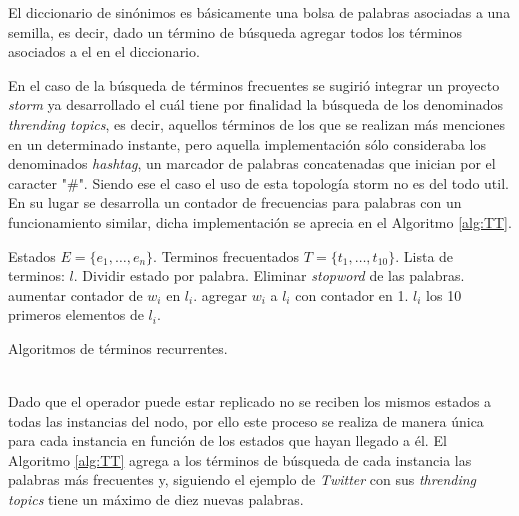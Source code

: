 El diccionario de sinónimos es básicamente una bolsa de palabras asociadas a una semilla, es decir, dado un término de búsqueda agregar todos los términos asociados a el en el diccionario.

En el caso de la búsqueda de términos frecuentes se sugirió integrar un proyecto \textit{storm} ya desarrollado el cuál tiene por finalidad la búsqueda de los denominados \textit{thrending topics}, es decir, aquellos términos de los que se realizan más menciones en un determinado instante, pero aquella implementación sólo consideraba los denominados \textit{hashtag}, un marcador de palabras concatenadas que inician por el caracter "\#". Siendo ese el caso el uso de esta topología storm no es del todo util. En su lugar se desarrolla un contador de frecuencias para palabras con un funcionamiento similar, dicha implementación se aprecia en el Algoritmo \ref{alg:TT}.\\

\begin{algorithm}[H]
	\begin{algorithmic}
		\REQUIRE Estados $E=\{e_{1}, \dots, e_{n} \}$.
		\ENSURE Terminos frecuentados $T=\{t_{1}, \dots, t_{10} \}$.
		\STATE Lista de terminos: $l$.
			\STATE Dividir estado por palabra.
			\STATE Eliminar \textit{stopword} de las palabras.
					\STATE aumentar contador de $w_{i}$ en $l_{i}$.
				\ELSE
					\STATE agregar $w_{i}$ a $l_{i}$ con contador en 1.
				\ENDIF		
			\ENDFOR
		\ENDFOR
			\RETURN $l_{i}$
		\ELSE
			\RETURN los 10 primeros elementos de $l_{i}$.
		\ENDIF
	\end{algorithmic}
	\caption{Algoritmos de términos recurrentes.}
	\label{alg:TT}
\end{algorithm}\vphantom\\

Dado que el operador puede estar replicado no se reciben los mismos estados a todas las instancias del nodo, por ello este proceso se realiza de manera única para cada instancia en función de los estados que hayan llegado a él. El Algoritmo \ref{alg:TT} agrega a los términos de búsqueda de cada instancia las palabras más frecuentes y, siguiendo el ejemplo de \textit{Twitter} con sus \textit{thrending topics} tiene un máximo de diez nuevas palabras.

